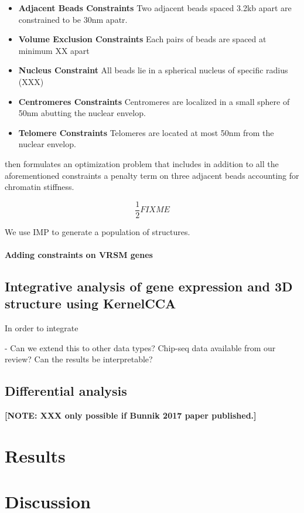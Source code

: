\documentclass[letterpaper,12pt]{article}
\newcommand{\note}[1]{\textbf{[NOTE: #1]}}
\begin{document}
\begin{itemize}
\item \textbf{Adjacent Beads Constraints} Two adjacent beads spaced 3.2kb apart are constrained to be 30nm apatr.
\item \textbf{Volume Exclusion Constraints} Each pairs of beads are spaced at minimum XX apart
\item \textbf{Nucleus Constraint} All beads lie in a spherical nucleus of specific
radius (XXX)
\item \textbf{Centromeres Constraints} Centromeres are localized in a small sphere of
50nm abutting the nuclear envelop.
\item \textbf{Telomere Constraints} Telomeres are located at most 50nm from the nuclear envelop.
\end{itemize}

\citet{tjong:physical} then formulates an optimization problem that includes
in addition to all the aforementioned constraints a penalty term on three
adjacent beads accounting for chromatin stiffness.

$$
\frac{1}{2} FIXME
$$

We use IMP to generate a population of structures.

\paragraph{Adding constraints on VRSM genes}

\subsection{Integrative analysis of gene expression and 3D structure using KernelCCA}

In order to integrate


- Can we extend this to other data types? Chip-seq data available from our
review? Can the results be interpretable?

\subsection{Differential analysis}
\note{XXX only possible if Bunnik 2017 paper published.}

\section{Results}
\label{sec3}

\section{Discussion}
\label{sec4}
\end{document}
